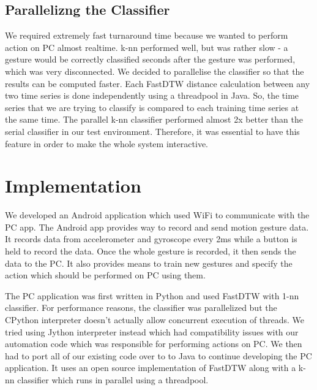 \documentclass{sigchi}
\begin{document}
\subsection{Parallelizng the Classifier}

We required extremely fast turnaround time because we wanted to perform action on PC almost realtime. k-nn performed well, but was rather slow - a gesture would be correctly classified seconds after the gesture was performed, which was very disconnected. We decided to parallelise the classifier so that the results can be computed faster. Each FastDTW distance calculation between any two time series is done independently using a threadpool in Java. So, the time series that we are trying to classify is compared to each training time series at the same time. The parallel k-nn classifier performed almost 2x better than the serial classifier in our test environment. Therefore, it was essential to have this feature in order to make the whole system interactive.


\section{Implementation}

We developed an Android application which used WiFi to communicate with the PC app. The Android app provides way to record and send motion gesture data. It records data from accelerometer and gyroscope every 2ms while a button is held to record the data. Once the whole gesture is recorded, it then sends the data to the PC. It also provides means to train new gestures and specify the action which should be performed on PC using them.

The PC application was first written in Python and used FastDTW with 1-nn classifier. For performance reasons, the classifier was parallelized but the CPython interpreter doesn't actually allow concurrent execution of threads. We tried using Jython interpreter instead which had compatibility issues with our automation code which was responsible for performing actions on PC. We then had to port all of our existing code over to to Java to continue developing the PC application. It uses an open source implementation of FastDTW \cite{fastdtw-java} along with a k-nn classifier which runs in parallel using a threadpool.
\end{document}
